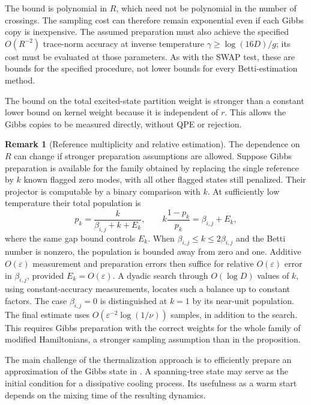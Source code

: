 \documentclass[a4paper,onecolumn,unpublished]{quantumarticle}
\theoremstyle{plain}
\theoremstyle{definition}
\theoremstyle{definition}
\newtheorem{remark}[theorem]{Remark}
\numberwithin{equation}{section}
\begin{document}
The bound is polynomial in $R$, which need not be polynomial
in the number of crossings. The sampling cost can therefore remain
exponential even if each Gibbs copy is inexpensive. The assumed
preparation must also achieve the specified $O(R^{-2})$ trace-norm
accuracy at inverse temperature $\gamma\ge\log(16D)/g$;
its cost must be evaluated at those parameters. As with the SWAP
test, these are bounds for the specified procedure, not lower bounds
for every Betti-estimation method.

The bound on the total excited-state partition weight is stronger
than a constant lower bound on kernel weight because it is
independent of $r$. This allows the Gibbs copies to be measured
directly, without QPE or rejection.

\begin{remark}[Reference multiplicity and relative estimation]
\label{rem:reference-multiplicity}
The dependence on $R$ can change if stronger preparation
assumptions are allowed. Suppose Gibbs preparation is available for the family
obtained by replacing the single reference by $k$ known flagged
zero modes, with all other flagged states still penalized.
Their projector is computable by a binary comparison with $k$.
At sufficiently low temperature their total population is
\[
 p_k=\frac{k}{\beta_{i,j}+k+E_k},\qquad
 k\frac{1-p_k}{p_k}=\beta_{i,j}+E_k,
\]
where the same gap bound controls $E_k$.
When $\beta_{i,j}\le k\le2\beta_{i,j}$ and the Betti
number is nonzero, the population is bounded away from zero
and one. Additive $O(\varepsilon)$ measurement and preparation
errors then suffice for relative $O(\varepsilon)$ error in
$\beta_{i,j}$, provided $E_k=O(\varepsilon)$.
A dyadic search through $O(\log D)$ values of $k$, using
constant-accuracy measurements, locates such a balance up to
constant factors. The case $\beta_{i,j}=0$ is distinguished at $k=1$
by its near-unit population. The final estimate uses
$O(\varepsilon^{-2}\log(1/\nu))$ samples, in addition to
the search. This requires Gibbs preparation with the correct
weights for the whole family of modified Hamiltonians, a stronger
sampling assumption than in the proposition.
\end{remark}

The main challenge of the thermalization approach is to efficiently
prepare an approximation of the Gibbs state in .
A spanning-tree state may serve as the initial condition for a
dissipative cooling process. Its usefulness as a warm start depends on
the mixing time of the resulting dynamics.
\end{document}
